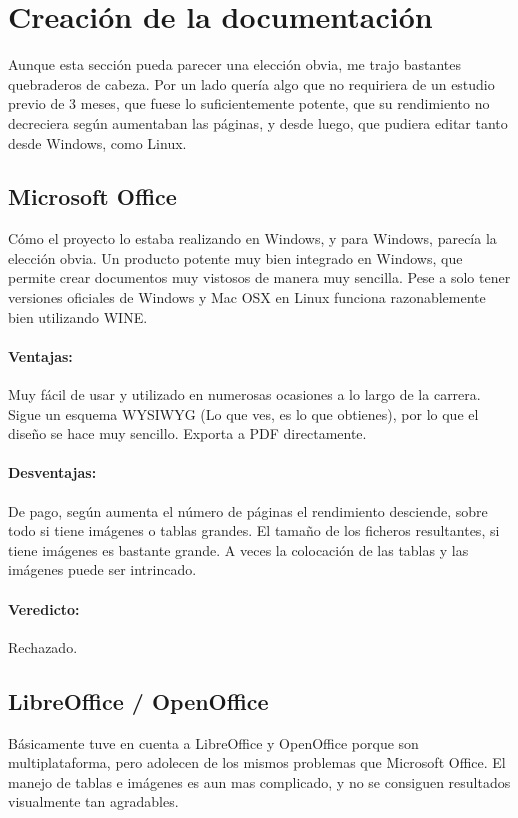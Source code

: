 \section{Creaci\'{o}n de la documentaci\'{o}n}
Aunque esta secci\'{o}n pueda parecer una elecci\'{o}n obvia, me trajo bastantes quebraderos de cabeza. Por un lado quer\'{i}a algo que no requiriera
de un estudio previo de 3 meses, que fuese lo suficientemente potente, que su rendimiento no decreciera seg\'{u}n aumentaban las p\'{a}ginas, y desde luego,
que pudiera editar tanto desde Windows, como Linux.
\subsection{Microsoft Office}
C\'{o}mo el proyecto lo estaba realizando en Windows, y para Windows, parec\'{i}a la elecci\'{o}n obvia. Un producto potente muy bien integrado
en Windows, que permite crear documentos muy vistosos de manera muy sencilla. Pese a solo tener versiones oficiales de Windows y Mac OSX en Linux
funciona razonablemente bien utilizando WINE.

\paragraph{Ventajas:} Muy f\'{a}cil de usar y utilizado en numerosas ocasiones a lo largo de la carrera. Sigue un esquema WYSIWYG (Lo que ves, es lo
que obtienes), por lo que el dise\~{n}o se hace muy sencillo. Exporta a PDF directamente.

\paragraph{Desventajas:} De pago, seg\'{u}n aumenta el n\'{u}mero de p\'{a}ginas el rendimiento desciende, sobre todo si tiene im\'{a}genes o tablas
grandes. El tama\~{n}o de los ficheros resultantes, si tiene im\'{a}genes es bastante grande. A veces la colocaci\'{o}n de las tablas y las im\'{a}genes
puede ser intrincado.

\paragraph{Veredicto:} Rechazado.


\subsection{LibreOffice / OpenOffice}
B\'{a}sicamente tuve en cuenta a LibreOffice y OpenOffice porque son multiplataforma, pero adolecen de los mismos problemas que Microsoft Office.
El manejo de tablas e im\'{a}genes es aun mas complicado, y no se consiguen resultados visualmente tan agradables.

